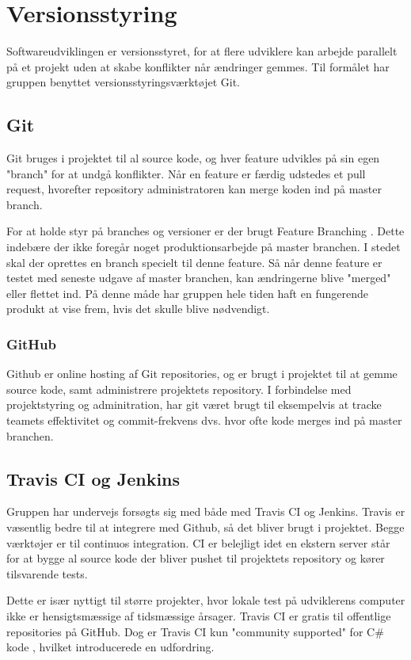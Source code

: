 \section{Versionsstyring}
Softwareudviklingen er versionsstyret, for at flere udviklere kan arbejde parallelt på et projekt uden at skabe konflikter når ændringer gemmes. Til formålet har gruppen benyttet versionsstyringsværktøjet Git.

\subsection{Git} 
Git bruges i projektet til al source kode, og hver feature udvikles på sin egen "branch" for at undgå konflikter. Når en feature er færdig udstedes et pull request, hvorefter repository administratoren kan merge koden ind på master branch.

For at holde styr på branches og versioner er der brugt Feature Branching \cite{atlassian2016}. Dette indebære der ikke foregår noget produktionsarbejde på master branchen. I stedet skal der oprettes en branch specielt til denne feature. Så når denne feature er testet med seneste udgave af master branchen, kan ændringerne blive "merged" eller flettet ind. På denne måde har gruppen hele tiden haft en fungerende produkt at vise frem, hvis det skulle blive nødvendigt.

\subsubsection{GitHub}
Github er online hosting af Git repositories, og er brugt i projektet til at gemme source kode, samt administrere projektets repository. I forbindelse med projektstyring og adminitration, har git været brugt til eksempelvis at tracke teamets effektivitet og commit-frekvens dvs. hvor ofte kode merges ind på master branchen.

\subsection{Travis CI og Jenkins} 
Gruppen har undervejs forsøgts sig med både med Travis CI og Jenkins. Travis er væsentlig bedre til at integrere med Github, så det bliver brugt i projektet.
Begge værktøjer er til continuos integration. CI er belejligt idet en ekstern server står for at bygge al source kode der bliver pushet til projektets repository og kører tilsvarende tests.

Dette er især nyttigt til større projekter, hvor lokale test på udviklerens computer ikke er hensigtsmæssige af tidsmæssige årsager. Travis CI er gratis til offentlige repositories på GitHub. Dog er Travis CI kun "community supported" for C\# kode \cite{communitysupportedlanguages2016}, hvilket introducerede en udfordring.

